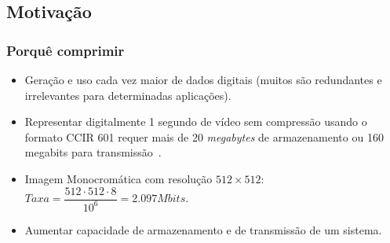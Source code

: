 \documentclass{beamer}
\begin{document}
\subsection{Motivação}
\begin{frame}
\frametitle{Porquê comprimir}
\begin{itemize}
    \item Geração e uso cada vez maior de dados digitais (muitos são redundantes e irrelevantes para determinadas aplicações).
    \item Representar digitalmente 1 segundo de vídeo sem compressão usando o formato CCIR 601 requer mais de 20 \textit{megabytes} de armazenamento ou 160 megabits para transmissão~\cite{book_compression}.
    \item Imagem Monocromática com resolução $512\times512$: $Taxa = \dfrac{512\cdot512\cdot8}{10^6} = 2.097 Mbits$.
    \item Aumentar capacidade de armazenamento e de transmissão de um sistema.
\end{itemize}
\end{frame}
\end{document}
